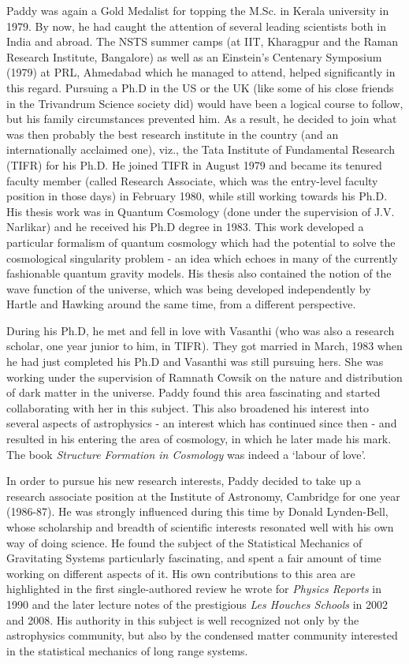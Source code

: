 \documentclass[prd, preprint, longbibliography, 11pt]{revtex4-1}
\begin{document}
Paddy was again a Gold Medalist for topping the
M.Sc. in Kerala university in 1979.
By now, he had caught  the attention of  several leading scientists
both in India and abroad.
The NSTS summer camps (at IIT, Kharagpur  and the Raman Research
Institute, Bangalore) as well as an Einstein's Centenary Symposium
(1979) at PRL, Ahmedabad which he managed to attend, helped
significantly in this regard.
Pursuing a Ph.D in the US or the UK (like some of his close friends in
the Trivandrum Science society did) would have been a logical course
to follow, but his family circumstances prevented him.
As a result, he decided to join what was then probably the best
research institute in the country (and an internationally acclaimed
one), viz., the Tata Institute of Fundamental Research (TIFR) for his
Ph.D.
He joined TIFR in August 1979 and became its tenured faculty member
(called Research Associate, which was the entry-level faculty position
in those days) in February 1980, while still working towards his
Ph.D.
His thesis work was in Quantum Cosmology (done under the supervision
of J.V. Narlikar) and he received his Ph.D degree  in 1983.
This work developed a particular formalism of quantum cosmology which
had the potential to  solve the cosmological singularity problem - an
idea which echoes in many of the currently fashionable  quantum
gravity models.
His thesis also contained  the notion of the wave function of the
universe, which was being developed independently by Hartle and
Hawking around the same time, from a different perspective.  

During his Ph.D, he met and fell in love with Vasanthi (who was also a
research scholar, one year junior to him, in TIFR).
They got married in March, 1983 when he had just completed his Ph.D
and Vasanthi was still pursuing hers.
She was working under the supervision of Ramnath Cowsik on the nature
and distribution of dark matter in the universe.
Paddy found this area fascinating and started collaborating with her
in this subject.
This also broadened his interest into several aspects of astrophysics
- an interest which has continued since then - and resulted in his
entering the area of cosmology, in which he later made his mark.
The book {\sl Structure Formation in Cosmology} was indeed a `labour of love'. 

In order to pursue his new research interests, Paddy decided to take
up a research associate position at the  Institute of Astronomy,
Cambridge for one year (1986-87).
He was strongly influenced during this time by Donald Lynden-Bell,
whose scholarship and breadth of scientific interests resonated well
with his own way of doing science.
He found the subject of the Statistical Mechanics of Gravitating
Systems particularly fascinating, and spent a fair amount of time
working on different aspects of it.
His own contributions to this area are highlighted in the first
single-authored review he wrote for \textit{Physics Reports} in 1990
and the later lecture notes of the prestigious \textit{Les Houches
  Schools} in 2002 and 2008.
His authority in  this subject is well recognized not only by the
astrophysics community, but also by the condensed matter community
interested in the statistical mechanics of long range systems. 
\end{document}
